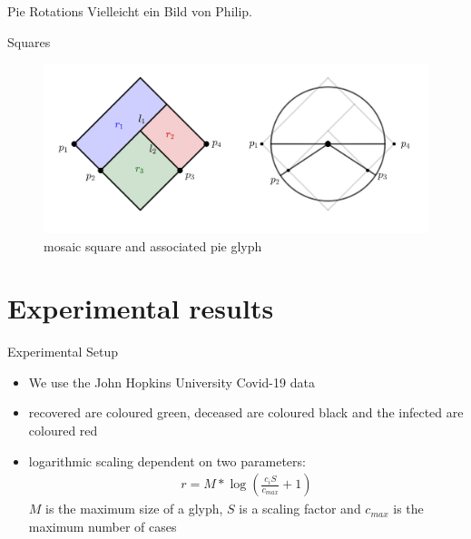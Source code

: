 \documentclass{beamer}
\begin{document}
\begin{frame}{Pie Rotations}
  Vielleicht ein Bild von Philip.
\end{frame}

\begin{frame}{Squares}
  
  \begin{figure}[h]
    \centering
      \includegraphics[width=0.9\linewidth]{slides/assets/square_bloat.png}
      \caption{mosaic square and associated pie glyph}
  \end{figure}
\end{frame}

\section{Experimental results}

\begin{frame}{Experimental Setup}
  \begin{itemize}
    \item We use the John Hopkins University Covid-19 data
    \item recovered are coloured green, deceased are coloured black and		the infected are coloured red
    \item logarithmic scaling dependent on two parameters:
      \begin{align*}
	r=M* \log \left( \frac{c_i S}{c_{max}} +1 \right)
      \end{align*}
      $M$ is the maximum size of a glyph, $S$ is a scaling factor and $c_{max}$ is			the maximum number of cases
  \end{itemize}
\end{frame}
\end{document}
